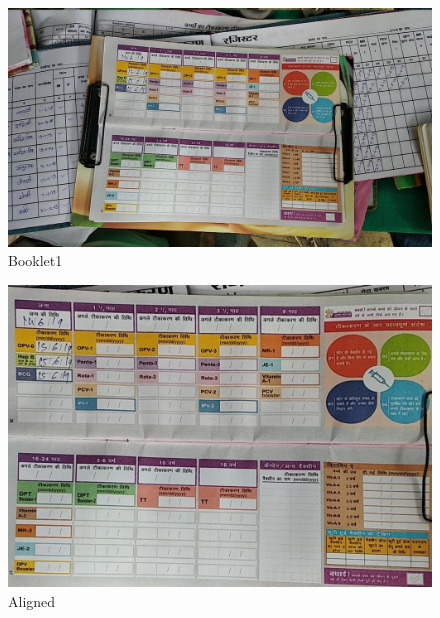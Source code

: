 \documentclass{article}
\begin{document}
\pagebreak
    \begin{figure}[!htb]
    \minipage{\textwidth}
    \begin{center}
      \includegraphics[scale=.25]{4/.report/_orig/b1.jpg}
      \caption{Booklet1}
    \end{center}
    \endminipage
    \end{figure}
    \begin{figure}[!htb]
    \minipage{\textwidth}
    \begin{center}
      \includegraphics[scale=.2]{4/.report/_aligned/b1.jpg}
      \caption{Aligned}
    \end{center}
    \endminipage
    \end{figure}
\end{document}
